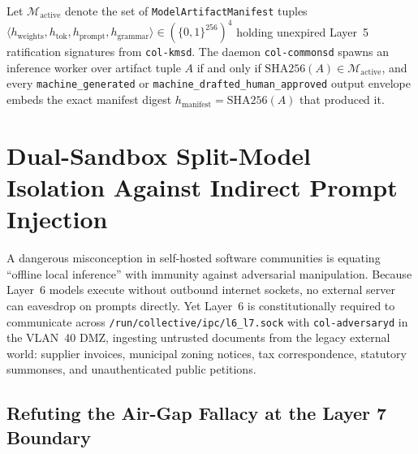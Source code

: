 \begin{invariant}
\label{inv:model-supply-chain}
Let $\mathcal{M}_{\mathrm{active}}$ denote the set of \texttt{ModelArtifactManifest} tuples $\langle h_{\mathrm{weights}}, h_{\mathrm{tok}}, h_{\mathrm{prompt}}, h_{\mathrm{grammar}} \rangle \in (\{0,1\}^{256})^4$ holding unexpired Layer~5 ratification signatures from \texttt{col-kmsd}. The daemon \texttt{col-commonsd} spawns an inference worker over artifact tuple $A$ if and only if $\mathrm{SHA256}(A) \in \mathcal{M}_{\mathrm{active}}$, and every \texttt{machine\_generated} or \texttt{machine\_drafted\_human\_approved} output envelope embeds the exact manifest digest $h_{\mathrm{manifest}} = \mathrm{SHA256}(A)$ that produced it.
\end{invariant}

\section{Dual-Sandbox Split-Model Isolation Against Indirect Prompt Injection}
\label{sec:split-sandbox-isolation}

A dangerous misconception in self-hosted software communities is equating ``offline local inference'' with immunity against adversarial manipulation. Because Layer~6 models execute without outbound internet sockets, no external server can eavesdrop on prompts directly. Yet Layer~6 is constitutionally required to communicate across \texttt{/run/collective/ipc/l6\_l7.sock} with \texttt{col-adversaryd} in the VLAN~40 DMZ, ingesting untrusted documents from the legacy external world: supplier invoices, municipal zoning notices, tax correspondence, statutory summonses, and unauthenticated public petitions.

\subsection{Refuting the Air-Gap Fallacy at the Layer 7 Boundary}
\label{subsec:airgap-fallacy}

